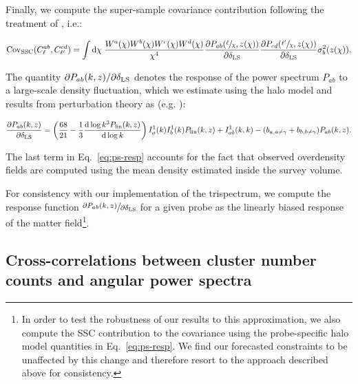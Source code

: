 \documentclass[%
 reprint,
nofootinbib,
 amsmath,amssymb,
 aps,
]{revtex4-1}
\begin{document}
Finally, we compute the super-sample covariance contribution following the treatment of \cite{Krause:2017}, i.e.:
\begin{widetext}
\begin{equation}
\begin{aligned}
\mathrm{Cov}_{\mathrm{SSC}}(C^{ab}_{\ell}, C^{cd}_{\ell'}) = \int \mathrm{d}\chi \;\frac{W^{a}(\chi)W^{b}(\chi)W^{c}(\chi)W^{d}(\chi)}{\chi^{4}} \frac{\partial P_{ab}(\sfrac{\ell}{\chi}, z(\chi))}{\partial \delta_{\rm LS}}\frac{\partial P_{cd}(\sfrac{\ell'}{\chi}, z(\chi))}{\partial \delta_{\rm LS}}\sigma^{2}_{b}(z(\chi)).
\end{aligned}
\end{equation}
\end{widetext}
The quantity $\partial P_{ab}(k, z)/\partial \delta_{\rm LS}$ denotes the response of the power spectrum $P_{ab}$ to a large-scale density fluctuation, which we estimate using the halo model and results from perturbation theory as (e.g. \cite{Krause:2017}):
\begin{widetext}
\begin{equation}
\begin{aligned}
\frac{\partial P_{ab}(k, z)}{\partial \delta_{\rm LS}} = \left( \frac{68}{21} - \frac{1}{3}\frac{\mathrm{d}\log{k^{3} P_{\mathrm{lin}}}(k, z)}{\mathrm{d}\log k} \right) I_{a}^{1}(k)I_{b}^{1}(k)P_{\mathrm{lin}}(k, z) + I_{ab}^{1}(k, k) - (b_{a, a \neq \gamma} + b_{b, b \neq \gamma})P_{ab}(k, z).
\label{eq:ps-resp}  
\end{aligned}
\end{equation}
\end{widetext}
The last term in Eq.~\ref{eq:ps-resp} accounts for the fact that observed overdensity fields are computed using the mean density estimated inside the survey volume.
    
For consistency with our implementation of the trispectrum, we compute the response function $\sfrac{\partial P_{ab}(k, z)}{\partial \delta_{\rm LS}} $ for a given probe as the linearly biased response of the matter field\footnote{In order to test the robustness of our results to this approximation, we also compute the SSC contribution to the covariance using the probe-specific halo model quantities in Eq.~\ref{eq:ps-resp}. We find our forecasted constraints to be unaffected by this change and therefore resort to the approach described above for consistency.}. 

\subsection{Cross-correlations between cluster number counts and angular power spectra}
\end{document}
